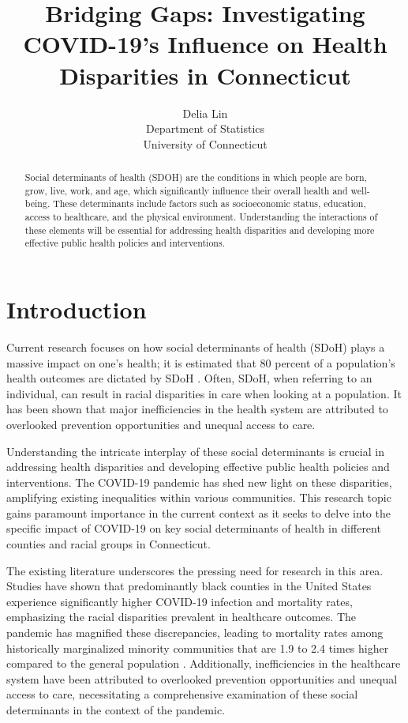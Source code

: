 \documentclass[12pt]{article}
\title{Bridging Gaps: Investigating COVID-19's Influence on Health Disparities in Connecticut}
\author{Delia Lin\\
  Department of Statistics\\
  University of Connecticut
}
\begin{document}
\maketitle

\begin{abstract}
    Social determinants of health (SDOH) are the conditions in which people are born, 
    grow, live, work, and age, which significantly influence their overall health and 
    well-being. These determinants include factors such as socioeconomic status, education, 
    access to healthcare, and the physical environment. Understanding the interactions of 
    these elements will be essential for addressing health disparities and developing more 
    effective public health policies and interventions.  
\end{abstract}

\section{Introduction}\label{sec:intro}


Current research focuses on how social determinants of health (SDoH) plays a  massive
impact on one's health; it is estimated that 80 percent of a population's health outcomes are 
dictated by SDoH \citep{HOOD2016129}. Often, SDoH, when referring to an individual, can result in racial 
disparities in care when looking at a population\citep{Monroe2023-uq}. It has been shown that major inefficiencies
in the health system are attributed to overlooked prevention opportunities and unequal access
to care.\citep{Allin2014-xn}

Understanding the intricate interplay of these social determinants is crucial in addressing health disparities 
and developing effective public health policies and interventions. The COVID-19 pandemic has shed new light on 
these disparities, amplifying existing inequalities within various communities. This research topic gains paramount 
importance in the current context as it seeks to delve into the specific impact of COVID-19 on key social determinants 
of health in different counties and racial groups in Connecticut.

The existing literature underscores the pressing need for research in this area. Studies have shown that predominantly 
black counties in the United States experience significantly higher COVID-19 infection and mortality rates, emphasizing 
the racial disparities prevalent in healthcare outcomes. The pandemic has magnified these discrepancies, leading to 
mortality rates among historically marginalized minority communities that are 1.9 to 2.4 times higher compared to the 
general population \citep{Badalov2022-wt}. Additionally, inefficiencies in the healthcare system have been attributed 
to overlooked prevention opportunities and unequal access to care, necessitating a comprehensive examination 
of these social determinants in the context of the pandemic.
\end{document}
